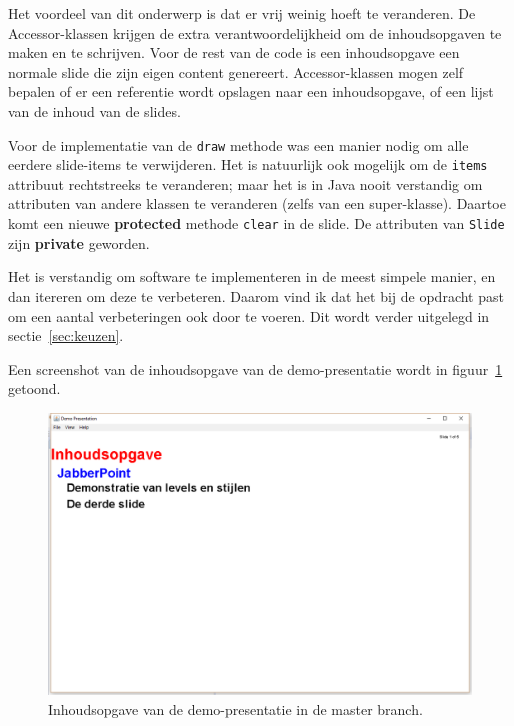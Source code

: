 \documentclass[a4paper]{article}
\newcommand{\code}[1]{\lstinline[columns=fixed]{#1}}
\begin{document}

    Het voordeel van dit onderwerp is dat er vrij weinig hoeft te veranderen.
    De Accessor-klassen krijgen de extra verantwoordelijkheid om de inhoudsopgaven te maken en te schrijven.
    Voor de rest van de code is een inhoudsopgave een normale slide die zijn eigen content genereert.
    Accessor-klassen mogen zelf bepalen of er een referentie wordt opslagen naar een inhoudsopgave, of een lijst van de inhoud van de slides.

    Voor de implementatie van de \code{draw} methode was een manier nodig om alle eerdere slide-items te verwijderen.
    Het is natuurlijk ook mogelijk om de \code{items} attribuut rechtstreeks te veranderen;
    maar het is in Java nooit verstandig om attributen van andere klassen te veranderen (zelfs van een super-klasse).
    Daartoe komt een nieuwe \textbf{protected} methode \code{clear} in de slide.
    De attributen van \code{Slide} zijn \textbf{private} geworden.

    Het is verstandig om software te implementeren in de meest simpele manier, en dan itereren om deze te verbeteren.
    Daarom vind ik dat het bij de opdracht past om een aantal verbeteringen ook door te voeren.
    Dit wordt verder uitgelegd in sectie~\ref{sec:keuzen}.

    Een screenshot van de inhoudsopgave van de demo-presentatie wordt in figuur~\ref{fig:master} getoond.
    \begin{figure}[!htb]
     \caption{
        Inhoudsopgave van de demo-presentatie in de master branch.\label{fig:master}
     }
     \centering \includegraphics[width=\textwidth]{Screenshots/master.png}
    \end{figure}
\end{document}
